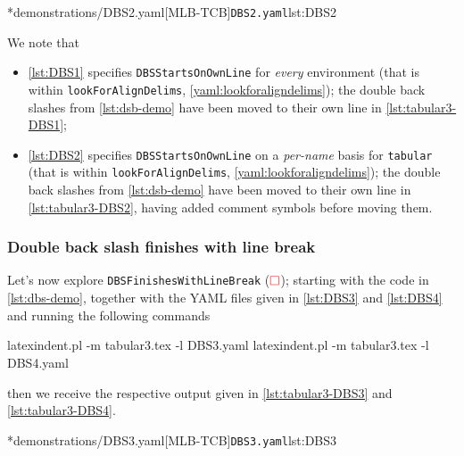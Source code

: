         \begin{cmhtcbraster}[raster column skip=.01\linewidth]
		\cmhlistingsfromfile*[style=yaml-LST]*{demonstrations/DBS2.yaml}[MLB-TCB]{\texttt{DBS2.yaml}}{lst:DBS2}
        \end{cmhtcbraster}

    We note that
    \begin{itemize}
      \item \cref{lst:DBS1} specifies \texttt{DBSStartsOnOwnLine} for \emph{every} environment (that is within \texttt{lookForAlignDelims}, \vref{yaml:lookforaligndelims});
        the double back slashes from \cref{lst:dsb-demo} have been moved to their own line in \cref{lst:tabular3-DBS1};
      \item \cref{lst:DBS2} specifies \texttt{DBSStartsOnOwnLine} on a \emph{per-name} basis for \texttt{tabular} (that is within \texttt{lookForAlignDelims}, \vref{yaml:lookforaligndelims});
        the double back slashes from \cref{lst:dsb-demo} have been moved to their own line in \cref{lst:tabular3-DBS2}, having added comment
        symbols before moving them.
    \end{itemize}

      \subsubsection{Double back slash finishes with line break}
      Let's now explore \texttt{DBSFinishesWithLineBreak} ($\color{red}\square$); starting with 
      the code in \cref{lst:dbs-demo}, together with the YAML files given in \cref{lst:DBS3} and \cref{lst:DBS4}
      and running the following commands
	\begin{commandshell}
latexindent.pl -m tabular3.tex -l DBS3.yaml
latexindent.pl -m tabular3.tex -l DBS4.yaml
            \end{commandshell}
      then we receive the respective output given in \cref{lst:tabular3-DBS3} and \cref{lst:tabular3-DBS4}.

        \begin{cmhtcbraster}[raster column skip=.01\linewidth]
		\cmhlistingsfromfile*[style=yaml-LST]*{demonstrations/DBS3.yaml}[MLB-TCB]{\texttt{DBS3.yaml}}{lst:DBS3}
        \end{cmhtcbraster}

